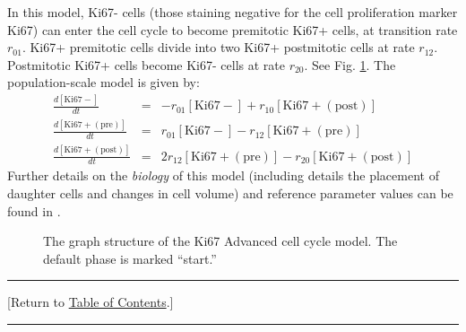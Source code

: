\documentclass[12pt]{article}
\newcommand{\beqa}{\begin{eqnarray}}
\newcommand{\eeqa}{\end{eqnarray}}
\renewcommand{\t}[1]{\left[\mathrm{#1}\right]}
\newcommand{\TOClink}{\begin{center}\hrule\vskip-10pt\phantom{.}\hfill[Return to \hyperlink{TOC}{Table of Contents}.]\hfill\phantom{.}\vskip3pt\hrule\end{center}}
\begin{document}
In this model, Ki67- cells (those staining negative for the 
cell proliferation marker Ki67) can enter the cell cycle to 
become premitotic Ki67+ cells, at transition rate $r_{01}$. Ki67+ premitotic cells 
divide into two Ki67+ postmitotic cells at rate $r_{12}$. 
Postmitotic Ki67+ cells become Ki67- cells at rate $r_{20}$. 
See Fig. \ref{fig:cycle_model:ki67_advanced}. The 
population-scale model is given by: 
\beqa
\frac{d\t{Ki67-}}{dt} & = & -r_{01} \t{Ki67-} + r_{10} \t{Ki67+ (post)} \\
\frac{d\t{Ki67+ (pre)}}{dt} & = &  r_{01} \t{Ki67-} -r_{12} \t{Ki67+ (pre)} \\
\frac{d\t{Ki67+ (post)}}{dt} & = &  2r_{12} \t{Ki67+ (pre)} -r_{20} \t{Ki67+ (post)} 
\eeqa
Further details on the \emph{biology} of this model (including 
details the placement of daughter cells and changes in cell 
volume) and reference parameter values can be found in \cite{ref:PhysiCell}. 

\begin{figure}
\begin{mdframed}[style=mystyle]
\caption{The graph structure of the Ki67 Advanced cell cycle model. The default phase is marked 
``start.''}
\label{fig:cycle_model:ki67_advanced}
\end{mdframed}
\end{figure}

\TOClink 
\end{document}
